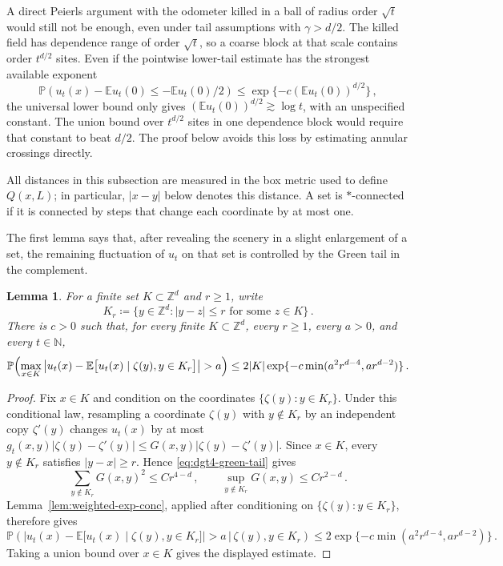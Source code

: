 \documentclass[11pt]{amsart}
\theoremstyle{plain}
\newtheorem{lemma}[theorem]{Lemma}
\theoremstyle{definition}
\newcommand{\Z}{\mathbb{Z}}
\newcommand{\N}{\mathbb{N}}
\newcommand{\E}{\mathbb{E}}
\renewcommand{\P}{\mathbb{P}}
\begin{document}
		A direct Peierls argument with the odometer killed in a ball of radius
		order $\sqrt t$ would still not be enough, even under tail assumptions
		with $\gamma>d/2$. The killed field has dependence range of order
		$\sqrt t$, so a coarse block at that scale contains order $t^{d/2}$
		sites. Even if the pointwise lower-tail estimate has the strongest
		available exponent
		\[
		\P\left(u_t(x)-\E u_t(0)\leq-\E u_t(0)/2\right) \leq \exp\{-c(\E u_t(0))^{d/2}\}\, ,
		\]
		the universal lower bound only gives
		$(\E u_t(0))^{d/2}\gtrsim\log t$, with an unspecified constant. The
		union bound over $t^{d/2}$ sites in one dependence block would require
		that constant to beat $d/2$. The proof below avoids this loss by
		estimating annular crossings directly.

		All distances in this subsection are measured in the box metric used to
		define $Q(x,L)$; in particular, $|x-y|$ below denotes this distance. A
		set is $\ast$-connected if it is connected by steps that change each
		coordinate by at most one.

		The first lemma says that, after revealing the scenery in a slight enlargement of a set, the remaining fluctuation of $u_t$ on that set is controlled by the Green tail in the complement. 
	\begin{lemma}\label{lem:dgt4-localization}
		For a finite set $K\subset\Z^d$ and $r\geq1$, write
		\[
			K_r\coloneqq \{y\in\Z^d: |y-z|\leq r\text{ for some }z\in K\}\, .
		\]
		There is $c>0$ such that, for every finite $K\subset\Z^d$, every
		$r\geq1$, every $a>0$, and every $t\in\N$,
		\[
			\P\Bigl(\max_{x\in K}\left|u_t(x)-\E\bigl[u_t(x)\mid \zeta(y), y\in K_r\bigr]\right|>a\Bigr)
			\leq 2|K|\exp\{-c\min(a^2r^{d-4}, ar^{d-2})\}\, .
		\]
	\end{lemma}
	\begin{proof}
		Fix $x\in K$ and condition on the coordinates
		$\{\zeta(y):y\in K_r\}$. Under this conditional law, resampling a
			coordinate $\zeta(y)$ with $y\notin K_r$ by an independent copy
			$\zeta'(y)$ changes $u_t(x)$ by at most
			$g_t(x,y)|\zeta(y)-\zeta'(y)|\leq G(x,y)|\zeta(y)-\zeta'(y)|$.
		Since $x\in K$, every $y\notin K_r$ satisfies
		$|y-x|\geq r$. Hence \eqref{eq:dgt4-green-tail} gives
		\[
		\sum_{y\notin K_r}G(x,y)^2\leq Cr^{4-d}\, , \qquad \sup_{y\notin K_r}G(x,y)\leq Cr^{2-d}\, .
		\]
		Lemma~\ref{lem:weighted-exp-conc}, applied after conditioning on
		$\{\zeta(y):y\in K_r\}$, therefore gives
		\[
			\P\left(
			\left.
			\left|u_t(x)-\E\bigl[u_t(x)\mid \zeta(y), y\in K_r\bigr]\right|>a
			\,\right|\,\zeta(y), y\in K_r
			\right)
			\leq
			2\exp\{-c\min(a^2r^{d-4}, ar^{d-2})\}\, .
		\]
		Taking a union bound over $x\in K$ gives the displayed estimate.
	\end{proof}
\end{document}
